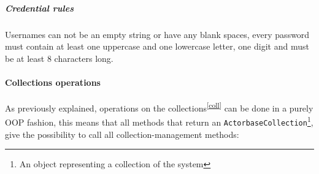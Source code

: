 \documentclass{scalatekids-article}
\begin{document}
\subparagraph{Credential rules}
Usernames can not be an empty string or have any blank spaces, every password must
contain at least one uppercase and one lowercase letter, one digit and must be at
least 8 characters long.

\paragraph{Collections operations}

As previously explained, operations on the collections\textsuperscript{\ref{coll}} can be done in a purely
OOP fashion, this means that all methods that return an \verb=ActorbaseCollection=\footnote{An object representing a collection of the system\label{ABcoll}},
give the possibility to call all collection-management methods:
\end{document}
